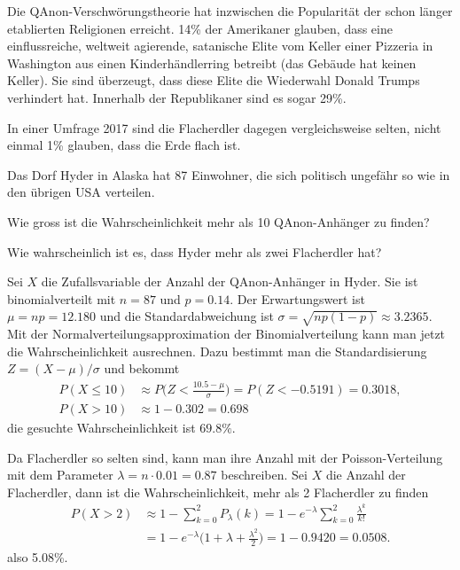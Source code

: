 Die QAnon-Verschwörungstheorie hat inzwischen die Popularität
der schon länger etablierten Religionen erreicht.
14\% der Amerikaner glauben, dass eine einflussreiche, weltweit agierende,
satanische Elite vom Keller einer Pizzeria in Washington
aus einen Kinderhändlerring betreibt (das Gebäude hat keinen Keller).
Sie sind überzeugt, dass diese Elite die Wiederwahl Donald Trumps
verhindert hat.
Innerhalb der Republikaner sind es sogar 29\%.

In einer Umfrage 2017 sind die Flacherdler dagegen vergleichsweise
selten, nicht einmal 1\% glauben, dass die Erde flach ist.

Das Dorf Hyder in Alaska hat 87 Einwohner, die sich politisch ungefähr
so wie in den übrigen USA verteilen.
\begin{teilaufgaben}
\item
Wie gross ist die Wahrscheinlichkeit mehr als 10 QAnon-Anhänger zu finden?
\item
Wie wahrscheinlich ist es, dass Hyder mehr als zwei Flacherdler hat?
\end{teilaufgaben}

\begin{loesung}
\begin{teilaufgaben}
\item
Sei $X$ die Zufallsvariable der Anzahl der QAnon-Anhänger in Hyder.
Sie ist binomialverteilt mit $n=87$ und $p=0.14$.
Der Erwartungswert ist $\mu=np=12.180$ und die Standardabweichung
ist $\sigma=\sqrt{np(1-p)}\approx 3.2365$.
Mit der Normalverteilungsapproximation der Binomialverteilung
kann man jetzt die Wahrscheinlichkeit ausrechnen.
Dazu bestimmt man die Standardisierung $Z=(X-\mu)/\sigma$ und
bekommt
\begin{align*}
P(X\le 10)
&\approx
P\biggl(Z < \frac{10.5-\mu}{\sigma}\biggr)
=
P(Z < -0.5191) = 0.3018,
\\
P(X > 10)
&\approx
1-0.302 = 0.698
\end{align*}
die gesuchte Wahrscheinlichkeit ist $69.8\%$.
\item
Da Flacherdler so selten sind, kann man ihre Anzahl mit der
Poisson-Verteilung mit dem Parameter $\lambda = n\cdot 0.01=0.87$
beschreiben.
Sei $X$ die Anzahl der Flacherdler, dann ist die Wahrscheinlichkeit,
mehr als 2 Flacherdler zu finden
\begin{align*}
P(X>2)
&\approx
1-\sum_{k=0}^2 P_\lambda(k)
=
1-e^{-\lambda} \sum_{k=0}^2 \frac{\lambda^k}{k!}
\\
&=
1-e^{-\lambda}\biggl(1+\lambda+\frac{\lambda^2}{2}\biggr)
=
1- 0.9420
=
0.0508.
\end{align*}
also 5.08\%.
\qedhere
\end{teilaufgaben}
\end{loesung}

